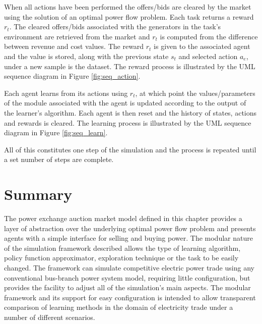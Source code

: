 
When all actions have been performed the offers/bids are cleared by the
market using the solution of an optimal power flow problem.  Each task returns
a reward $r_t$.  The cleared offers/bids associated with the generators in the task's environment are retrieved from the market
and $r_t$ is computed from the difference between revenue and cost values.
The reward $r_t$ is given to the associated agent and the value is stored,
along with the previous state $s_t$ and selected action $a_e$, under a new
sample is the dataset.  The reward process is illustrated by the UML sequence
diagram in Figure \ref{fig:seq_action}.


Each agent learns from its actions using $r_t$, at which point the
values/parameters of the module associated with the agent is updated according
to the output of the learner's algorithm.  Each agent is then reset and the
history of states, actions and rewards is cleared.  The learning process is
illustrated by the UML sequence diagram in  Figure \ref{fig:seq_learn}.

All of this constitutes one step of the simulation and the process is
repeated until a set number of steps are complete.

\section{Summary}
The power exchange auction market model defined in this chapter provides a
layer of abstraction over the underlying optimal power flow problem and
presents agents with a simple interface for selling and buying power.  The
modular nature of the simulation framework described allows the type of
learning algorithm, policy function approximator, exploration technique or the
task to be easily changed.  The framework can simulate competitive electric
power trade using any conventional bus-branch power system model, requiring
little configuration, but provides the facility to adjust all of the
simulation's main aspects. The modular framework and its support for easy
configuration is intended to allow transparent comparison of learning methods
in the domain of electricity trade under a number of different scenarios.
